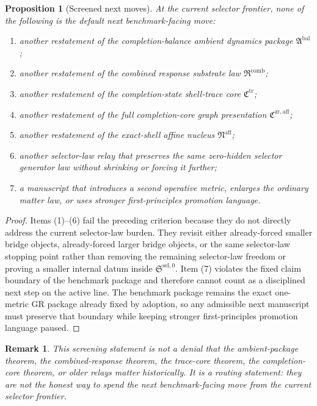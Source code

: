 \documentclass[11pt]{article}
\newcommand{\CompletionCore}{\mathfrak C^{\mathrm{zr,aff}}}
\newcommand{\TraceCore}{\mathfrak C^{\mathrm{tr}}}
\newcommand{\AffineNucleus}{\mathfrak N^{\mathrm{aff}}}
\newcommand{\AmbientPackage}{\mathfrak A^{\mathrm{bal}}}
\newcommand{\CombinedLaw}{\mathfrak R^{\mathrm{comb}}}
\newcommand{\SelectorLaw}{\mathfrak S^{\mathrm{sel},0}}
\newtheorem{proposition}{Proposition}
\newtheorem{remark}{Remark}
\begin{document}
\begin{proposition}[Screened next moves]
At the current selector frontier, none of the following is the default next benchmark-facing move:
\begin{enumerate}
    \item another restatement of the completion-balance ambient dynamics package \(\AmbientPackage\);
    \item another restatement of the combined response substrate law \(\CombinedLaw\);
    \item another restatement of the completion-state shell-trace core \(\TraceCore\);
    \item another restatement of the full completion-core graph presentation \(\CompletionCore\);
    \item another restatement of the exact-shell affine nucleus \(\AffineNucleus\);
    \item another selector-law relay that preserves the same zero-hidden selector generator law without shrinking or forcing it further;
    \item a manuscript that introduces a second operative metric, enlarges the ordinary matter law, or uses stronger first-principles promotion language.
\end{enumerate}
\end{proposition}

\begin{proof}
Items (1)--(6) fail the preceding criterion because they do not directly address the current selector-law burden. They revisit either already-forced smaller bridge objects, already-forced larger bridge objects, or the same selector-law stopping point rather than removing the remaining selector-law freedom or proving a smaller internal datum inside \(\SelectorLaw\). Item (7) violates the fixed claim boundary of the benchmark package and therefore cannot count as a disciplined next step on the active line. The benchmark package remains the exact one-metric GR package already fixed by adoption, so any admissible next manuscript must preserve that boundary while keeping stronger first-principles promotion language paused.
\end{proof}

\begin{remark}
This screening statement is not a denial that the ambient-package theorem, the combined-response theorem, the trace-core theorem, the completion-core theorem, or older relays matter historically. It is a routing statement: they are not the honest way to spend the next benchmark-facing move from the current selector frontier.
\end{remark}
\end{document}
